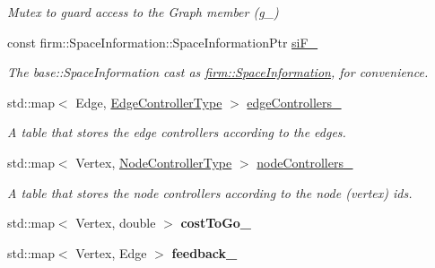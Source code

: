 \begin{DoxyCompactItemize}
\begin{DoxyCompactList}\small\item\em \-Mutex to guard access to the \-Graph member (g\-\_\-) \end{DoxyCompactList}\item 
\hypertarget{class_f_i_r_m_afd4f91dc510bf7b5b68b4da5cfd90718}{const \*
firm\-::\-Space\-Information\-::\-Space\-Information\-Ptr \hyperlink{class_f_i_r_m_afd4f91dc510bf7b5b68b4da5cfd90718}{si\-F\-\_\-}}\label{class_f_i_r_m_afd4f91dc510bf7b5b68b4da5cfd90718}

\begin{DoxyCompactList}\small\item\em \-The base\-::\-Space\-Information cast as \hyperlink{classfirm_1_1_space_information}{firm\-::\-Space\-Information}, for convenience. \end{DoxyCompactList}\item 
\hypertarget{class_f_i_r_m_a47d8d0e04faf98787e5c1f9ec6859fbc}{std\-::map$<$ \-Edge, \*
\hyperlink{class_f_i_r_m_a70abcb24fbc9f836b94119f65c8f8a37}{\-Edge\-Controller\-Type} $>$ \hyperlink{class_f_i_r_m_a47d8d0e04faf98787e5c1f9ec6859fbc}{edge\-Controllers\-\_\-}}\label{class_f_i_r_m_a47d8d0e04faf98787e5c1f9ec6859fbc}

\begin{DoxyCompactList}\small\item\em \-A table that stores the edge controllers according to the edges. \end{DoxyCompactList}\item 
\hypertarget{class_f_i_r_m_a93f8fe7008fb117d283d510876a249c6}{std\-::map$<$ \-Vertex, \*
\hyperlink{class_controller}{\-Node\-Controller\-Type} $>$ \hyperlink{class_f_i_r_m_a93f8fe7008fb117d283d510876a249c6}{node\-Controllers\-\_\-}}\label{class_f_i_r_m_a93f8fe7008fb117d283d510876a249c6}

\begin{DoxyCompactList}\small\item\em \-A table that stores the node controllers according to the node (vertex) ids. \end{DoxyCompactList}\item 
\hypertarget{class_f_i_r_m_a44d15ba1ffcb963bf840935ee8a030e2}{std\-::map$<$ \-Vertex, double $>$ {\bfseries cost\-To\-Go\-\_\-}}\label{class_f_i_r_m_a44d15ba1ffcb963bf840935ee8a030e2}

\item 
\hypertarget{class_f_i_r_m_a0d6d7d7d1942e83f48b4897929a533f2}{std\-::map$<$ \-Vertex, \-Edge $>$ {\bfseries feedback\-\_\-}}\label{class_f_i_r_m_a0d6d7d7d1942e83f48b4897929a533f2}


\end{DoxyCompactItemize}
